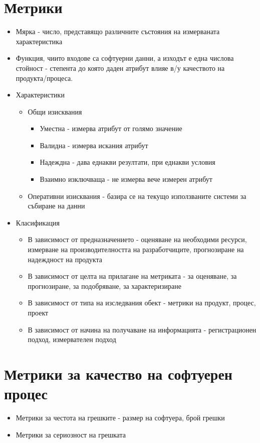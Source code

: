 \documentclass[fleqn,12pt]{article}
\begin{document}
\begin{flushleft}
\begin{itemize}
\section{Метрики}
    \begin{itemize}
        \item Мярка - число, представящо различните състояния на измерваната характеристика
        \item Функция, чиито входове са софтуерни данни, а изходът е една числова стойност - степента до която даден атрибут влияе в/у качеството на продукта/процеса.
        \item Характеристики
            \begin{itemize}
                \item Общи изисквания
                    \begin{itemize}
                        \item Уместна - измерва атрибут от голямо значение
                      \item Валидна - измерва искания атрибут
                        \item Надеждна - дава еднакви резултати, при еднакви условия
                        \item Взаимно изключваща - не измерва вече измерен атрибут
                   \end{itemize}
                 \item Оперативни изисквания - базира се на текущо използваните системи за събиране на данни
            \end{itemize}
        \item Класификация
            \begin{itemize}
                \item В зависимост от предназначението - оценяване на необходими ресурси, измерване на производителността на разработчиците, прогнозиране на надеждност на продукта
                \item В зависимост от целта на прилагане на метриката - за оценяване, за прогнозиране, за подобряване, за характеризиране
                \item В зависимост от типа на изследвания обект - метрики на продукт, процес, проект
                \item В зависимост от начина на получаване на информацията - регистрационен подход, измервателен подход
            \end{itemize}
    \end{itemize}
\section{Метрики за качество на софтуерен процес}
    \begin{itemize}
        \item Метрики за честота на грешките - размер на софтуера, брой грешки 
        \item Метрики за сериозност на грешката

\end{itemize}
\end{itemize}
\end{flushleft}
\end{document}
